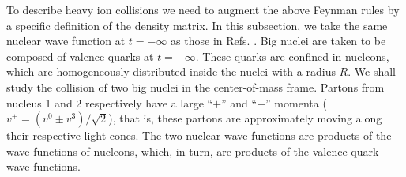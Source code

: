 \documentclass[onecolumn,showpacs,nobibnotes,nofootinbib,12pt,aps,prd,showpacs,notitlepage,nofootinbib,preprintnumbers,amsmath,amssymb]{article}
\begin{document}
To describe heavy ion collisions we need to augment the above Feynman
rules by a specific definition of the density matrix. In this
subsection, we take the same nuclear wave function at $t=-\infty$ as
those in
Refs. \cite{Mueller:1989st,McLerran:1993ni,McLerran:1994vd,Kovchegov:1996ty}. Big
nuclei are taken to be composed of valence quarks at
$t=-\infty$. These quarks are confined in nucleons, which are
homogeneously distributed inside the nuclei with a radius $R$. We
shall study the collision of two big nuclei in the center-of-mass
frame. Partons from nucleus 1 and 2 respectively have a large ``$+$''
and ``$-$'' momenta ($v^\pm = (v^0 \pm v^3)/\sqrt{2}$), that is, these
partons are approximately moving along their respective
light-cones. The two nuclear wave functions are products of the wave
functions of nucleons, which, in turn, are products of the valence
quark wave functions.
\end{document}

